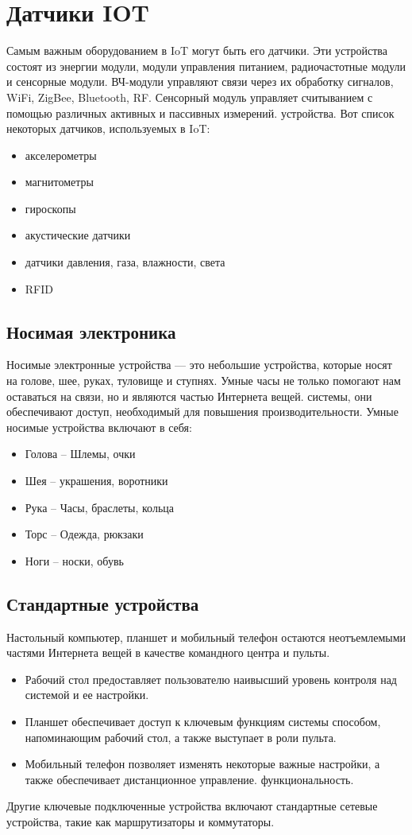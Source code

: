 \section{Датчики IOT}
Самым важным оборудованием в IoT могут быть его датчики. Эти устройства состоят из энергии
модули, модули управления питанием, радиочастотные модули и сенсорные модули. ВЧ-модули управляют
связи через их обработку сигналов, WiFi, ZigBee, Bluetooth, RF.
Сенсорный модуль управляет считыванием с помощью различных активных и пассивных измерений.
устройства. Вот список некоторых датчиков, используемых в IoT:
\begin{itemize}
    \item акселерометры
    \item магнитометры
    \item гироскопы
    \item акустические датчики
    \item датчики давления, газа, влажности, света
    \item RFID
\end{itemize}

\subsection{Носимая электроника}
Носимые электронные устройства — это небольшие устройства, которые носят на голове, шее, руках, туловище и ступнях.
Умные часы не только помогают нам оставаться на связи, но и являются частью Интернета вещей.\cite{IoTArch}
системы, они обеспечивают доступ, необходимый для повышения производительности.
Умные носимые устройства включают в себя:
\begin{itemize}
    \item Голова – Шлемы, очки
    \item Шея – украшения, воротники
    \item Рука – Часы, браслеты, кольца
    \item Торс – Одежда, рюкзаки
    \item Ноги – носки, обувь
\end{itemize}

\subsection{Стандартные устройства}
Настольный компьютер, планшет и мобильный телефон остаются неотъемлемыми частями Интернета вещей в качестве командного центра и
пульты.
\begin{itemize}
    \item Рабочий стол предоставляет пользователю наивысший уровень контроля над системой и ее
    настройки.
    \item Планшет обеспечивает доступ к ключевым функциям системы способом, напоминающим
    рабочий стол, а также выступает в роли пульта.
    \item Мобильный телефон позволяет изменять некоторые важные настройки, а также обеспечивает дистанционное управление.
    функциональность.
\end{itemize}
Другие ключевые подключенные устройства включают стандартные сетевые устройства, такие как маршрутизаторы и коммутаторы.
